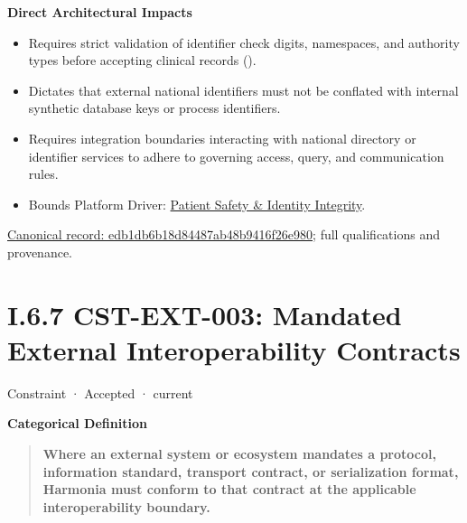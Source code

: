 \par\medskip\textbf{Direct Architectural Impacts}\par


\begin{itemize}


\item Requires strict validation of identifier check digits, namespaces, and authority types before accepting clinical records (\href{\detokenize{../../../../../../../../../docs/markdown/01-motivation/requirements-constraints/foundational-requirements.md}}{\texttt{}}).

\item Dictates that external national identifiers must not be conflated with internal synthetic database keys or process identifiers.

\item Requires integration boundaries interacting with national directory or identifier services to adhere to governing access, query, and communication rules.

\item Bounds Platform Driver: \href{\detokenize{../../../../../../../../../docs/markdown/01-motivation/drivers-assessments/drivers.md}}{Patient Safety \& Identity Integrity}.

\end{itemize}

{\footnotesize \href{../../../../../../../../continuum/motivation/constraint/edb1db6b18d84487ab48b9416f26e980.md}{Canonical record: edb1db6b18d84487ab48b9416f26e980}; full qualifications and provenance.}\par
\section*{I.6.7 CST-EXT-003: Mandated External Interoperability Contracts}
\label{navigation:I.6.7}

\label{element:cad6d41364ef4bb1ae0a2a519db11da4}
{\small Constraint · Accepted · current}\par

\par\medskip\textbf{Categorical Definition}\par


\begin{quote}


\textbf{Where an external system or ecosystem mandates a protocol, information standard, transport contract, or serialization format, Harmonia must conform to that contract at the applicable interoperability boundary.}



\end{quote}


